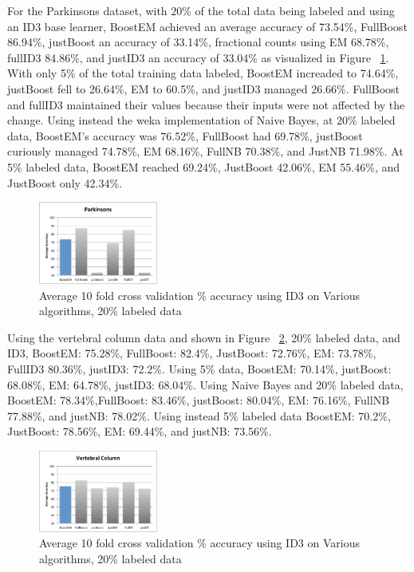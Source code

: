 \documentclass{sig-alternate}
\begin{document}
For the Parkinsons dataset, with $20\%$ of the total data being labeled and using an ID3 base learner, BoostEM achieved an average accuracy of 73.54\%, FullBoost 86.94\%, justBoost an accuracy of 33.14\%, fractional counts using EM 68.78\%, fullID3 84.86\%, and justID3 an accuracy of 33.04\% as visualized in Figure ~\ref{parkAcc}. With only 5\% of the total training data labeled, BoostEM increaded to 74.64\%, justBoost fell to 26.64\%, EM to 60.5\%, and justID3 managed 26.66\%.  FullBoost and fullID3 maintained their values because their inputs were not affected by the change. 
Using instead the weka implementation of Naive Bayes, at 20\% labeled data, BoostEM's accuracy was 76.52\%, FullBoost had 69.78\%, justBoost curiously managed 74.78\%, EM 68.16\%, FullNB 70.38\%, and JustNB 71.98\%. At 5\% labeled data, BoostEM reached 69.24\%, JustBoost 42.06\%, EM 55.46\%, and JustBoost only 42.34\%.

\begin{figure}
\centering
\includegraphics[width=0.35\textwidth]{figures/parkAcc.pdf}
\caption{Average 10 fold cross validation \% accuracy using ID3 on Various algorithms, 20\% labeled data}
\label{parkAcc}
\end{figure}

Using the vertebral column data and shown in Figure ~\ref{vertAcc}, 20\% labeled data, and ID3, BoostEM: 75.28\%, FullBoost: 82.4\%, JustBoost: 72.76\%, EM: 73.78\%, FullID3 80.36\%, justID3: 72.2\%.  Using 5\% data, BoostEM: 70.14\%, justBoost: 68.08\%, EM: 64.78\%, justID3: 68.04\%. 
Using Naive Bayes and 20\% labeled data, BoostEM: 78.34\%,FullBoost: 83.46\%, justBoost: 80.04\%, EM: 76.16\%, FullNB 77.88\%, and justNB: 78.02\%. Using instead 5\% labeled data BoostEM: 70.2\%, JustBoost: 78.56\%, EM: 69.44\%, and justNB: 73.56\%.

\begin{figure}
\centering
\includegraphics[width=0.35\textwidth]{figures/vertAcc.pdf}
\caption{Average 10 fold cross validation \% accuracy using ID3 on Various algorithms, 20\% labeled data}
\label{vertAcc}
\end{figure}
\end{document}
